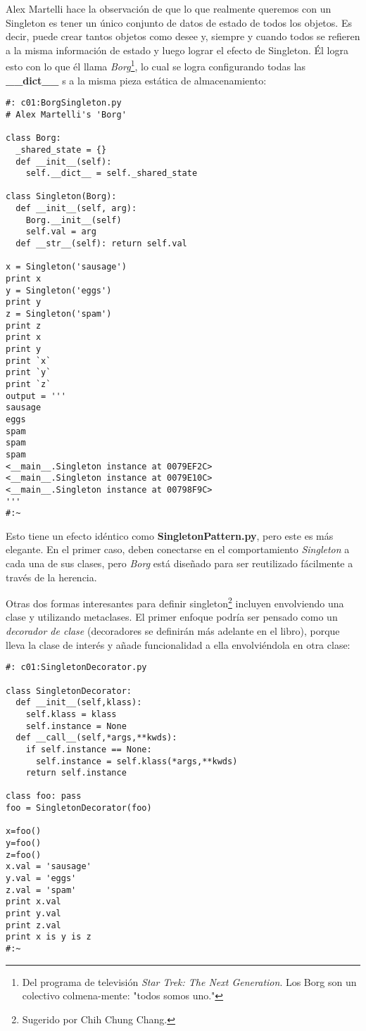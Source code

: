 Alex Martelli hace la observación de que lo que realmente queremos con un Singleton es tener un único conjunto de datos de estado de todos los objetos. Es decir, puede crear tantos objetos como desee y, siempre y cuando todos se refieren a la misma información de estado y luego lograr el efecto de Singleton. Él logra esto con lo que él llama \textit{Borg}\footnote{Del programa de televisión \textit{Star Trek: The Next Generation}. Los Borg son un colectivo colmena-mente: "todos somos uno."}, lo cual se logra configurando todas las \textbf{ \_\_dict\_\_ }s a la misma pieza estática de almacenamiento:     \newline

 \begin{lstlisting}
#: c01:BorgSingleton.py 
# Alex Martelli's 'Borg' 

class Borg: 
  _shared_state = {} 
  def __init__(self): 
    self.__dict__ = self._shared_state 
    
class Singleton(Borg): 
  def __init__(self, arg): 
    Borg.__init__(self) 
    self.val = arg 
  def __str__(self): return self.val 
  
x = Singleton('sausage') 
print x 
y = Singleton('eggs') 
print y 
z = Singleton('spam') 
print z 
print x 
print y 
print `x` 
print `y` 
print `z` 
output = ''' 
sausage 
eggs 
spam 
spam 
spam 
<__main__.Singleton instance at 0079EF2C> 
<__main__.Singleton instance at 0079E10C> 
<__main__.Singleton instance at 00798F9C> 
''' 
#:~     
    \end{lstlisting}

    Esto tiene un efecto idéntico como \textbf{SingletonPattern.py}, pero este es más elegante. En el primer caso, deben conectarse en el comportamiento \textit{Singleton} a cada una de sus clases, pero \textit{Borg} está diseñado para ser reutilizado fácilmente a través de la herencia.     \newline
    
    Otras dos formas interesantes para definir singleton\footnote{Sugerido por Chih Chung Chang.} incluyen envolviendo una clase y utilizando metaclases. 
El primer enfoque podría ser pensado como un \textit{decorador de clase} 
(decoradores se definirán más adelante en el libro), porque lleva la clase de interés y añade funcionalidad a ella envolviéndola en otra clase:   \newline

     \begin{lstlisting}
#: c01:SingletonDecorator.py

class SingletonDecorator: 
  def __init__(self,klass): 
    self.klass = klass 
    self.instance = None 
  def __call__(self,*args,**kwds): 
    if self.instance == None: 
      self.instance = self.klass(*args,**kwds) 
    return self.instance 
    
class foo: pass 
foo = SingletonDecorator(foo) 

x=foo() 
y=foo() 
z=foo() 
x.val = 'sausage' 
y.val = 'eggs' 
z.val = 'spam' 
print x.val 
print y.val 
print z.val 
print x is y is z 
#:~ 
\end{lstlisting}



